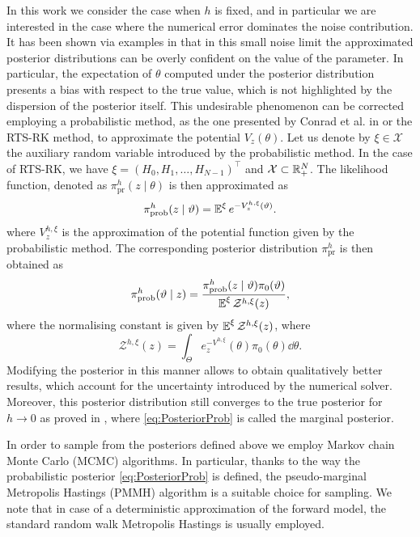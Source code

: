 \documentclass[10pt]{article}
\begin{document}
In this work we consider the case when $h$ is fixed, and in particular we are interested in the case where the numerical error dominates the noise contribution. It has been shown via examples in \cite{CGS16, COS17} that in this small noise limit the approximated posterior distributions can be overly confident on the value of the parameter. In particular, the expectation of $\theta$ computed under the posterior distribution presents a bias with respect to the true value, which is not highlighted by the dispersion of the posterior itself. This undesirable phenomenon can be corrected employing a probabilistic method, as the one presented by Conrad et al. in \cite{CGS16} or the RTS-RK method, to approximate the potential $V_z(\theta)$. Let us denote by $\xi \in \mathcal{X}$ the auxiliary random variable introduced by the probabilistic method. In the case of RTS-RK, we have $\xi = (H_0, H_1, \ldots, H_{N-1})^\top$ and $\mathcal{X} \subset \mathbb{R}_+^N$. The likelihood function, denoted as  $\pi^h_{\mathrm{pr}}(z\mid\theta)$ is then approximated as 
\begin{equation}\label{eq:LikelihoodProb}
	\pi^h_{\mathrm{prob}}(z\mid \vartheta) = \operatorname{\mathbb{E}}^\xi e^{-V^{h,\xi}_{z}(\vartheta)}.
\end{equation}
where $V^{h, \xi}_{z}$ is the approximation of the potential function given by the probabilistic method. The corresponding posterior distribution $\pi^h_{\mathrm{pr}}$ is then obtained as
\begin{equation}\label{eq:PosteriorProb}
	\pi^h_{\mathrm{prob}}(\vartheta\mid z) = \frac{\pi^h_{\mathrm{prob}}(z\mid \vartheta)\pi_0(\vartheta)}{\operatorname{\mathbb{E}}^\xi \mathcal Z^{h, \xi}(z)},
\end{equation}
where the normalising constant is given by $\operatorname{\mathbb{E}}^\xi \mathcal Z^{h, \xi}(z)$, where
\begin{equation}
	\mathcal Z^{h, \xi}(z) = \int_{\Theta} e^{-V^{h,\xi}}_{z}(\theta) \pi_0(\theta) \dd \theta.
\end{equation}
Modifying the posterior in this manner allows to obtain qualitatively better results, which account for the uncertainty introduced by the numerical solver. Moreover, this posterior distribution still converges to the true posterior for $h \to 0$ as proved in \cite{LST18}, where \eqref{eq:PosteriorProb} is called the marginal posterior.

In order to sample from the posteriors defined above we employ Markov chain Monte Carlo (MCMC) algorithms. In particular, thanks to the way the probabilistic posterior \eqref{eq:PosteriorProb} is defined, the pseudo-marginal Metropolis Hastings (PMMH) algorithm \cite{AnR09} is a suitable choice for sampling. We note that in case of a deterministic approximation of the forward model, the standard random walk Metropolis Hastings is usually employed.
\end{document}
